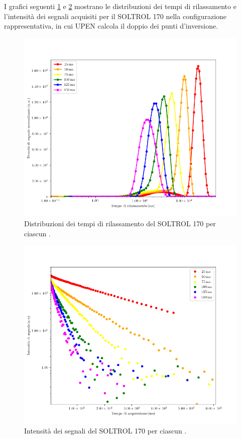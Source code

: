 I grafici seguenti \ref{fig:D_s170} e \ref{fig:S_s170} mostrano le distribuzioni dei tempi di rilassamento e l'intensità dei segnali acquisiti per il SOLTROL 170 nella configurazione rappresentativa, in cui UPEN calcola il doppio dei punti d'inversione.

\begin{figure}[h!]
\centering
\includegraphics[scale=0.3]{Figure/SOLTROL170.png}
\caption{Distribuzioni dei tempi di rilassamento del SOLTROL 170 per ciascun \tau.}
\label{fig:D_s170}
\end{figure}

\begin{figure}[h!]
\centering
\includegraphics[scale=0.3]{Figure/SOLTROL170_SigTSig.png}
\caption{Intensità dei segnali del SOLTROL 170 per ciascun \tau.}
\label{fig:S_s170}
\end{figure}

